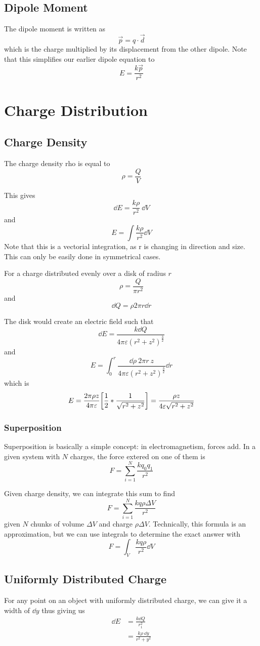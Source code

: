 \documentclass[12pt]{article}
\newcommand{\inint}[2]{\int #1 \dd #2}
\begin{document}
\subsection*{Dipole Moment}
The dipole moment is written as \[ \vec{p} = q \cdot \vec{d} \] which is the charge multiplied by its displacement from the other dipole. Note that this simplifies our earlier dipole equation to \[ E = \frac{k\vec{p}}{r^2} \]

\section*{Charge Distribution}
\subsection*{Charge Density}
The charge density rho is equal to \[ \rho = \frac{Q}{V} \]

This gives \[ \dd E = \frac{k \rho}{r^2}\ \dd V \] and \[ E = \inint{\frac{k \rho}{r^2}}{V} \] Note that this is a vectorial integration, as r is changing in direction and size. This can only be easily done in symmetrical cases.

For a charge distributed evenly over a disk of radius $r$ \[ \rho = \frac{Q}{\pi r^2} \] and \[ \dd Q = \rho 2\pi r \dd r \]

The disk would create an electric field such that \[ \dd E = \frac{k \dd Q}{4\pi \varepsilon (r^2 + z^2)^{\frac{3}{2}}} \] and \[ E = \int_0^r \frac{\dd \rho\ 2\pi r\ z}{4\pi \varepsilon (r^2 + z^2)^{\frac{3}{2}}} \dd r \] which is \[ E = \frac{2\pi \rho z}{4\pi \varepsilon} \bigg[\frac{1}{2} * \frac{1}{\sqrt{r^2 + z^2}} \bigg] = \frac{\rho z}{4\varepsilon \sqrt{r^2 + z^2}} \]

\subsubsection*{Superposition}
Superposition is basically a simple concept: in electromagnetism, forces add. In a given system with $N$ charges, the force extered on one of them is \[ F = \sum_{i = 1}^{N} \frac{kq_0q_1}{r^2} \]

Given charge density, we can integrate this sum to find \[ F = \sum_{i = 1}^{N} \frac{kq\rho \Delta V}{r^2} \] given $N$ chunks of volume $\Delta V$ and charge $\rho \Delta V$. Technically, this formula is an approximation, but we can use integrals to determine the exact answer with \[ F = \int_V \frac{kq\rho}{r^2} \dd V \]

\subsection*{Uniformly Distributed Charge}
For any point on an object with uniformly distributed charge, we can give it a width of $\dd y$ thus giving us
\begin{align*}
\dd E &= \frac{k \dd Q}{r_1^2} \\
      &= \frac{k \rho\ \dd y}{r^2 + y^2}
\end{align*}
\end{document}
